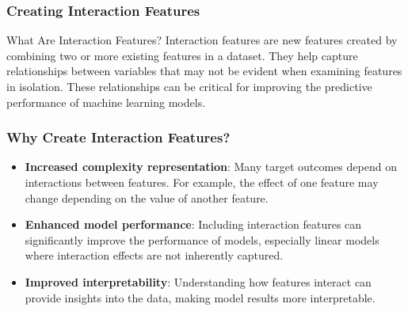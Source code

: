 \documentclass[aspectratio=169]{beamer}
\begin{document}
\begin{frame}[fragile]
  \frametitle{Creating Interaction Features}
  \begin{block}{What Are Interaction Features?}
  Interaction features are new features created by combining two or more existing features in a dataset. They help capture relationships between variables that may not be evident when examining features in isolation. These relationships can be critical for improving the predictive performance of machine learning models.
  \end{block}
\end{frame}

\begin{frame}[fragile]
  \frametitle{Why Create Interaction Features?}
  \begin{itemize}
    \item \textbf{Increased complexity representation}: Many target outcomes depend on interactions between features. For example, the effect of one feature may change depending on the value of another feature.
    \item \textbf{Enhanced model performance}: Including interaction features can significantly improve the performance of models, especially linear models where interaction effects are not inherently captured.
    \item \textbf{Improved interpretability}: Understanding how features interact can provide insights into the data, making model results more interpretable.
  \end{itemize}
\end{frame}
\end{document}
